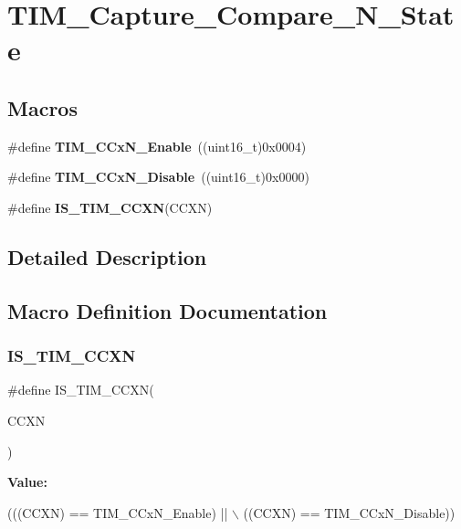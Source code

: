 \section{T\+I\+M\+\_\+\+Capture\+\_\+\+Compare\+\_\+\+N\+\_\+\+State}
\label{group__TIM__Capture__Compare__N__State}
\subsection*{Macros}
\begin{DoxyCompactItemize}
\item 
\#define \textbf{ T\+I\+M\+\_\+\+C\+Cx\+N\+\_\+\+Enable}~((uint16\+\_\+t)0x0004)
\item 
\#define \textbf{ T\+I\+M\+\_\+\+C\+Cx\+N\+\_\+\+Disable}~((uint16\+\_\+t)0x0000)
\item 
\#define \textbf{ I\+S\+\_\+\+T\+I\+M\+\_\+\+C\+C\+XN}(C\+C\+XN)
\end{DoxyCompactItemize}


\subsection{Detailed Description}


\subsection{Macro Definition Documentation}
\mbox{\label{group__TIM__Capture__Compare__N__State_gad5a9f961e44c8d7c24066ac37ec79cbc}} 
\subsubsection{I\+S\+\_\+\+T\+I\+M\+\_\+\+C\+C\+XN}
{\footnotesize\ttfamily \#define I\+S\+\_\+\+T\+I\+M\+\_\+\+C\+C\+XN(\begin{DoxyParamCaption}\item[{}]{C\+C\+XN }\end{DoxyParamCaption})}

{\bfseries Value\+:}
\begin{DoxyCode}
(((CCXN) == TIM_CCxN_Enable) || \(\backslash\)
                           ((CCXN) == TIM_CCxN_Disable))
\end{DoxyCode}


